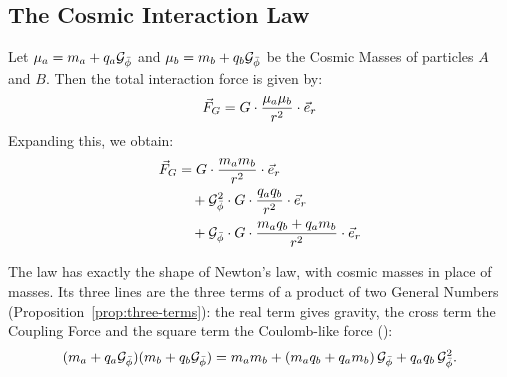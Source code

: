 \subsection{The Cosmic Interaction Law}\label{subsec:cosmic-force}

\begin{theorem}\label{thm:cosmic-law}
Let $\mu_a = m_a + q_a\mathcal{G}_{\bar{\phi}}$ and $\mu_b = m_b + q_b\mathcal{G}_{\bar{\phi}}$ be the Cosmic Masses of particles $A$ and $B$. Then the total interaction force is given by:
\[
\vec{F}_G = G \cdot \frac{\mu_a \mu_b}{r^2} \cdot \vec{e}_r
\]
Expanding this, we obtain:
\begin{align*}
\vec{F}_G &= G \cdot \frac{m_a m_b}{r^2} \cdot \vec{e}_r \\
          &\quad + \mathcal{G}_{\bar{\phi}}^2 \cdot G \cdot \frac{q_a q_b}{r^2} \cdot \vec{e}_r \\
          &\quad + \mathcal{G}_{\bar{\phi}} \cdot G \cdot \frac{m_a q_b + q_a m_b}{r^2} \cdot \vec{e}_r
\end{align*}
\end{theorem}

\begin{plainwords}
The law has exactly the shape of Newton's law, with cosmic masses in place of masses. Its three lines are the three terms of a product of two General Numbers (Proposition~\ref{prop:three-terms}): the real term gives gravity, the cross term the Coupling Force and the square term the Coulomb-like force ():
\[
(m_a + q_a\mathcal{G}_{\bar{\phi}})(m_b + q_b\mathcal{G}_{\bar{\phi}}) = m_a m_b + (m_a q_b + q_a m_b)\,\mathcal{G}_{\bar{\phi}} + q_a q_b\,\mathcal{G}_{\bar{\phi}}^2 .
\]
\end{plainwords}

